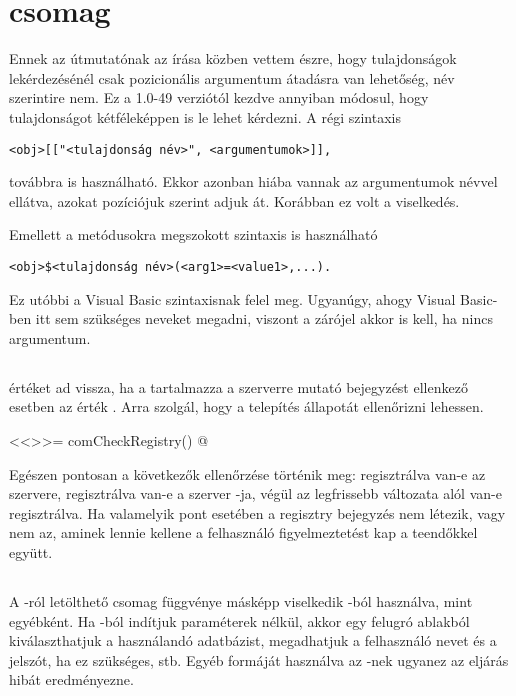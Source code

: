 \section{ csomag}\label{sec:10.1}
Ennek az útmutatónak az írása közben vettem észre, hogy tulajdonságok
lekérdezésénél csak pozicionális argumentum átadásra van lehetőség,
név szerintire nem. Ez a 1.0-49 verziótól 
kezdve annyiban módosul, hogy tulajdonságot kétféleképpen is le lehet
kérdezni. A régi szintaxis
\begin{verbatim}
<obj>[["<tulajdonság név>", <argumentumok>]],
\end{verbatim}
továbbra is használható. Ekkor azonban hiába vannak az argumentumok névvel ellátva, azokat pozíciójuk szerint adjuk át. Korábban ez volt a viselkedés.

Emellett a metódusokra megszokott szintaxis is használható
\begin{verbatim}
<obj>$<tulajdonság név>(<arg1>=<value1>,...).
\end{verbatim}
Ez utóbbi a 
Visual Basic szintaxisnak felel meg. Ugyanúgy, ahogy Visual Basic-ben
itt sem szükséges neveket megadni, viszont a zárójel akkor is kell, ha
nincs argumentum. 

\subsection{}
 értéket ad vissza, ha a  tartalmazza a 
szerverre mutató bejegyzést ellenkező esetben az érték
. Arra szolgál, hogy a telepítés állapotát ellenőrizni
lehessen. 
\begin{Rnw}
<<>>=
comCheckRegistry()
@
\end{Rnw}
Egészen pontosan a következők ellenőrzése történik meg: regisztrálva
van-e az  
szervere, regisztrálva van-e a  szerver -ja, végül az  
legfrissebb változata 
alól van-e regisztrálva. Ha valamelyik pont esetében a regisztry
bejegyzés nem létezik, vagy 
nem az, aminek lennie kellene a felhasználó figyelmeztetést kap a
teendőkkel együtt. 

\subsection{}

A -ról letölthető  csomag
 függvénye másképp viselkedik 
-ból használva, mint egyébként. Ha -ból indítjuk
paraméterek nélkül, akkor egy felugró ablakból kiválaszthatjuk a
használandó adatbázist, megadhatjuk a felhasználó nevet és a jelszót,
ha ez szükséges, stb. Egyéb formáját használva az -nek
ugyanez az eljárás hibát eredményezne.

